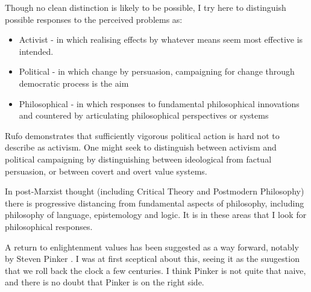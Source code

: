 \documentclass[10pt,titlepage]{book}
\begin{document}
Though no clean distinction is likely to be possible, I try here to distinguish possible responses to the perceived problems as:

\begin{itemize}
\item Activist -
  in which realising effects by whatever means seem most effective is intended.
\item Political -
  in which change by persuasion, campaigning for change through democratic process is the aim
\item Philosophical -
  in which responses to fundamental philosophical innovations and countered by articulating philosophical perspectives or systems
\end{itemize}

Rufo demonstrates that sufficiently vigorous political action is hard not to describe as activism.
One might seek to distinguish between activism and political campaigning by distinguishing between ideological from factual persuasion, or between covert and overt value systems.

In post-Marxist thought (including Critical Theory and Postmodern Philosophy) there is progressive distancing from fundamental aspects of philosophy, including philosophy of language, epistemology and logic.
It is in these areas that I look for philosophical responses.

A return to enlightenment values has been suggested as a way forward, notably by Steven Pinker \cite{pinker-en}.
I was at first sceptical about this, seeing it as the suugestion that we roll back the clock a few centuries.
I think Pinker is not quite that naive, and there is no doubt that Pinker is on the right side.

{}








\end{document}
